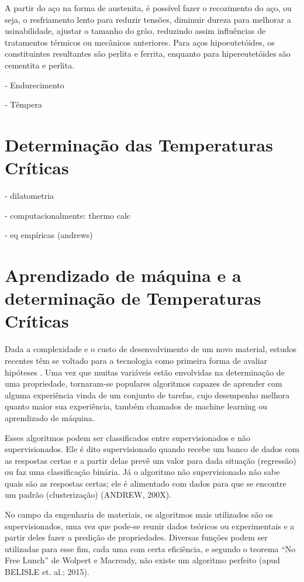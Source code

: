 \documentclass[brazil,dissertacao,epusp]{usp}
\begin{document}
A partir do aço na forma de austenita, é possível fazer o recozimento do aço, ou seja, o resfriamento lento para reduzir tensões, diminuir dureza para melhorar a usinabilidade, ajustar o tamanho do grão, reduzindo assim influências de tratamentos térmicos ou mecânicos anteriores. Para aços hipoeutetóides, os constituintes resultantes são perlita e ferrita, enquanto para hipereutetóides são cementita e perlita.

- Endurecimento

- Têmpera

\section{Determinação das Temperaturas Críticas}

- dilatometria

- computacionalmente: thermo calc

- eq empíricas (andrews)


\section{Aprendizado de m\'aquina e a determinação de Temperaturas Cr\'iticas}

Dada a complexidade e o custo de desenvolvimento de um novo material, estudos recentes têm se voltado para a tecnologia como primeira forma de avaliar hipóteses \cite{Belisle2015}. Uma vez que muitas variáveis estão envolvidas na determinação de uma propriedade, tornaram-se populares algoritmos capazes de aprender com alguma experiência vinda de um conjunto de tarefas,  cujo desempenho melhora quanto maior sua experiência, também chamados de machine learning ou aprendizado de máquina.

Esses algoritmos podem ser classificados entre supervisionados e não supervisionados. Ele é dito supervisionado quando recebe um banco de dados com as respostas certas e a partir delas prevê um valor para dada situação (regressão) ou faz uma classificação binária. Já o algoritmo não supervisionado não sabe quais são as respostas certas; ele é alimentado com dados para que se encontre um padrão (clusterização) (ANDREW, 200X).

No campo da engenharia de materiais, os algoritmos mais utilizados são os supervisionados, uma vez que pode-se reunir dados teóricos ou experimentais e a partir deles fazer a predição de propriedades. Diversas funções podem ser utilizadas para esse fim, cada uma com certa eficiência, e segundo o teorema ``No Free Lunch'' de Wolpert e Macready, não existe um algoritmo perfeito (apud BELISLE et. al.; 2015).
\end{document}
